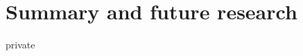 \documentclass[11pt,a4paper,notitlepage]{report}
\begin{document}
\chapter{Summary and future research}


\begin{shownto}{private}
\begin{appendices}
%
%
%
%
%
%
%
%

%
\end{appendices}
\end{shownto}
	
%	

\end{document}
